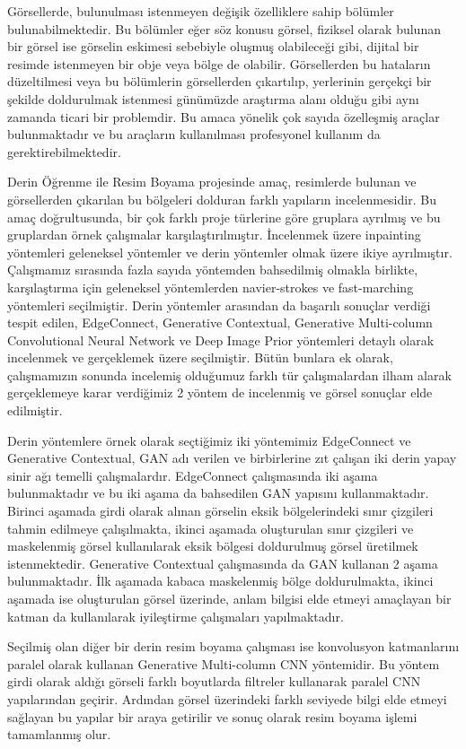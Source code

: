 Görsellerde, bulunulması istenmeyen değişik özelliklere sahip bölümler bulunabilmektedir. Bu bölümler eğer söz konusu görsel, fiziksel olarak bulunan bir görsel ise görselin eskimesi sebebiyle oluşmuş olabileceği gibi, dijital bir resimde istenmeyen bir obje veya bölge de olabilir. Görsellerden bu hataların düzeltilmesi veya bu bölümlerin görsellerden çıkartılıp, yerlerinin gerçekçi bir şekilde doldurulmak istenmesi günümüzde araştırma alanı olduğu gibi aynı zamanda ticari bir problemdir. Bu amaca yönelik çok sayıda özelleşmiş araçlar bulunmaktadır ve bu araçların kullanılması profesyonel kullanım da gerektirebilmektedir.

Derin Öğrenme ile Resim Boyama projesinde amaç, resimlerde bulunan ve görsellerden çıkarılan bu bölgeleri dolduran farklı yapıların incelenmesidir. Bu amaç doğrultusunda, bir çok farklı proje türlerine göre gruplara ayrılmış ve bu gruplardan örnek çalışmalar karşılaştırılmıştır. İncelenmek üzere inpainting yöntemleri geleneksel yöntemler ve derin yöntemler olmak üzere ikiye ayrılmıştır. Çalışmamız sırasında fazla sayıda yöntemden bahsedilmiş olmakla birlikte, karşılaştırma için geleneksel yöntemlerden navier-strokes ve fast-marching yöntemleri seçilmiştir. Derin yöntemler arasından da başarılı sonuçlar verdiği tespit edilen, EdgeConnect, Generative Contextual, Generative Multi-column Convolutional Neural Network ve Deep Image Prior yöntemleri detaylı olarak incelenmek ve gerçeklemek üzere seçilmiştir. Bütün bunlara ek olarak, çalışmamızın sonunda incelemiş olduğumuz farklı tür çalışmalardan ilham alarak gerçeklemeye karar verdiğimiz 2 yöntem de incelenmiş ve görsel sonuçlar elde edilmiştir.

Derin yöntemlere örnek olarak seçtiğimiz iki yöntemimiz EdgeConnect ve Generative Contextual, GAN adı verilen ve birbirlerine zıt çalışan iki derin yapay sinir ağı temelli çalışmalardır. EdgeConnect çalışmasında iki aşama bulunmaktadır ve bu iki aşama da bahsedilen GAN yapısını kullanmaktadır. Birinci aşamada girdi olarak alınan görselin eksik bölgelerindeki sınır çizgileri tahmin edilmeye çalışılmakta, ikinci aşamada oluşturulan sınır çizgileri ve maskelenmiş görsel kullanılarak eksik bölgesi doldurulmuş görsel üretilmek istenmektedir. Generative Contextual çalışmasında da GAN kullanan 2 aşama bulunmaktadır. İlk aşamada kabaca maskelenmiş bölge doldurulmakta, ikinci aşamada ise oluşturulan görsel üzerinde, anlam bilgisi elde etmeyi amaçlayan bir katman da kullanılarak iyileştirme çalışmaları yapılmaktadır.

Seçilmiş olan diğer bir derin resim boyama çalışması ise konvolusyon katmanlarını paralel olarak kullanan Generative Multi-column CNN yöntemidir. Bu yöntem girdi olarak aldığı görseli farklı boyutlarda filtreler kullanarak paralel CNN yapılarından geçirir. Ardından görsel üzerindeki farklı seviyede bilgi elde etmeyi sağlayan bu yapılar bir araya getirilir ve sonuç olarak resim boyama işlemi tamamlanmış olur.


